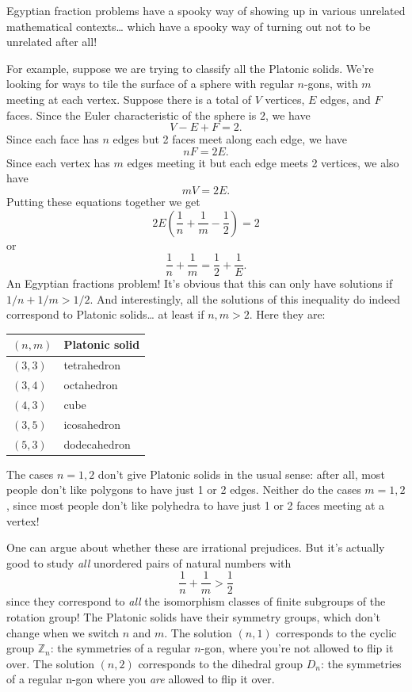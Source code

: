 \documentclass{article}
\renewcommand{\texttt}[1]{%
  \begingroup
  \ttfamily
  \begingroup\lccode`~=`/\lowercase{\endgroup\def~}{/\discretionary{}{}{}}%
  \begingroup\lccode`~=`[\lowercase{\endgroup\def~}{[\discretionary{}{}{}}%
  \begingroup\lccode`~=`.\lowercase{\endgroup\def~}{.\discretionary{}{}{}}%
  \catcode`/=\active\catcode`[=\active\catcode`.=\active
  \scantokens{#1\noexpand}%
  \endgroup
}
\begin{document}

Egyptian fraction problems have a spooky way of showing up in various
unrelated mathematical contexts\ldots{} which have a spooky way of
turning out not to be unrelated after all!

For example, suppose we are trying to classify all the Platonic solids.
We're looking for ways to tile the surface of a sphere with regular
\(n\)-gons, with \(m\) meeting at each vertex. Suppose there is a total
of \(V\) vertices, \(E\) edges, and \(F\) faces. Since the Euler
characteristic of the sphere is \(2\), we have \[V - E + F = 2.\] Since
each face has \(n\) edges but 2 faces meet along each edge, we have
\[nF = 2E.\] Since each vertex has \(m\) edges meeting it but each edge
meets 2 vertices, we also have \[mV = 2E.\] Putting these equations
together we get \[2E\left(\frac1n + \frac1m - \frac12\right) = 2\] or
\[\frac1n + \frac1m = \frac12 + \frac1E.\] An Egyptian fractions
problem! It's obvious that this can only have solutions if
\(1/n + 1/m > 1/2\). And interestingly, all the solutions of this
inequality do indeed correspond to Platonic solids\ldots{} at least if
\(n,m > 2\). Here they are:

\begin{longtable}[]{@{}ll@{}}
\toprule
\((n,m)\) & Platonic solid\tabularnewline
\midrule
\endhead
\((3,3)\) & tetrahedron\tabularnewline
\((3,4)\) & octahedron\tabularnewline
\((4,3)\) & cube\tabularnewline
\((3,5)\) & icosahedron\tabularnewline
\((5,3)\) & dodecahedron\tabularnewline
\bottomrule
\end{longtable}

The cases \(n = 1,2\) don't give Platonic solids in the usual sense:
after all, most people don't like polygons to have just 1 or 2 edges.
Neither do the cases \(m = 1,2\), since most people don't like polyhedra
to have just 1 or 2 faces meeting at a vertex!

One can argue about whether these are irrational prejudices. But it's
actually good to study \emph{all} unordered pairs of natural numbers
with \[\frac1n + \frac1m > \frac12\] since they correspond to \emph{all}
the isomorphism classes of finite subgroups of the rotation group! The
Platonic solids have their symmetry groups, which don't change when we
switch \(n\) and \(m\). The solution \((n,1)\) corresponds to the cyclic
group \(\mathbb{Z}_n\): the symmetries of a regular \(n\)-gon, where
you're not allowed to flip it over. The solution \((n,2)\) corresponds
to the dihedral group \(D_n\): the symmetries of a regular n-gon where
you \emph{are} allowed to flip it over.
\end{document}
